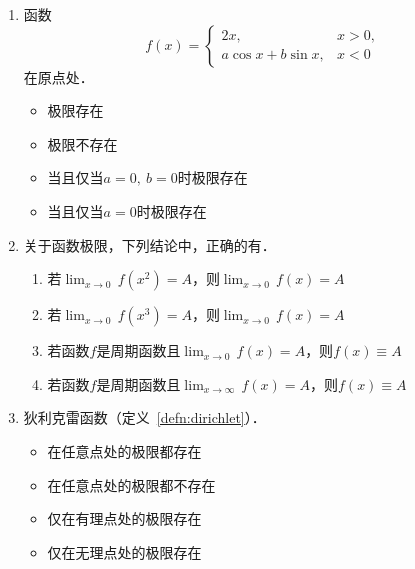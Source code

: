 \documentclass[a4paper,punct=CCT]{ctexbook}
\renewcommand*{\enumparen}[1]{（\makebox[0.6em][c]{\normalfont#1}）}
\theoremstyle{definition}
\theoremstyle{remark}
\newif\ifshowsol
\begin{document}
\begin{enumerate}
\item 函数
  \begin{equation*}
    f(x) =
    \begin{cases}
      2x, & x > 0, \\
      a \cos x + b \sin x, & x < 0
    \end{cases}
  \end{equation*}
  在原点处\uline{\makebox[6em]{}}．
  \begin{itemize}
    \renewcommand{\labelitemi}{\faCircleThin}
  \item 极限存在
  \item 极限不存在
  \item 当且仅当\(a = 0,\ b = 0\)时极限存在
    \ifshowsol
  \item[\faCircle]
    \else
  \item
    \fi
    当且仅当\(a = 0\)时极限存在
  \end{itemize}

\item 关于函数极限，下列结论中，正确的有\uline{\makebox[6em]{%
      \ifshowsol
      \enumparen{2}%
      \enumparen{4}
      \fi}}．
  \begin{enumerate}
    \renewcommand{\labelenumii}{\enumparen{\arabic{enumii}}}
  \item 若\(\lim_{x\to0} \,f(x^2) = A\)，则\(\lim_{x\to0} \,f(x) = A\)
  \item 若\(\lim_{x\to0} \,f(x^3) = A\)，则\(\lim_{x\to0} \,f(x) = A\)
  \item 若函数\(f\)是周期函数且\(\lim_{x\to0} \,f(x) = A\)，则\(f(x) \equiv A\)
  \item 若函数\(f\)是周期函数且\(\lim_{x\to\infty} \,f(x) = A\)，则\(f(x) \equiv A\)
  \end{enumerate}

\item 狄利克雷函数（定义~\ref{defn:dirichlet}）\uline{\makebox[6em]{}}．
  \begin{itemize}
    \renewcommand{\labelitemi}{\faCircleThin}
  \item 在任意点处的极限都存在
    \ifshowsol
  \item[\faCircle]
    \else
  \item
    \fi
    在任意点处的极限都不存在
  \item 仅在有理点处的极限存在
  \item 仅在无理点处的极限存在
  \end{itemize}


\end{enumerate}
\end{document}
